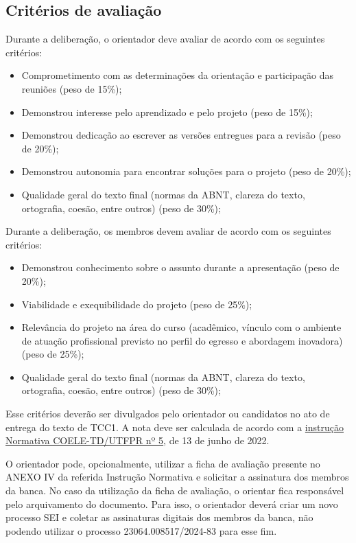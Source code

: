 \documentclass[a4paper, 12pt]{article}
\newcommand{\seiprocess}{23064.008517/2024-83} %
\begin{document}
	\subsection{Critérios de avaliação}

	Durante a deliberação, o orientador deve avaliar de acordo com os seguintes critérios:

	\begin{itemize}
		\item Comprometimento com as determinações da orientação e participação das reuniões (peso de 15\%);
		\item Demonstrou interesse pelo aprendizado e pelo projeto (peso de 15\%);
		\item Demonstrou dedicação ao escrever as versões entregues para a revisão (peso de 20\%);
		\item Demonstrou autonomia para encontrar soluções para o projeto (peso de 20\%);
		\item Qualidade geral do texto final (normas da ABNT, clareza do texto, ortografia, coesão, entre outros) (peso de 30\%);
	\end{itemize}

	Durante a deliberação, os membros devem avaliar de acordo com os seguintes critérios:

	\begin{itemize}
		\item Demonstrou conhecimento sobre o assunto durante a apresentação (peso de 20\%);
		\item Viabilidade e exequibilidade do projeto (peso de 25\%);
		\item Relevância do projeto na área do curso (acadêmico, vínculo com o ambiente de atuação profissional previsto no perfil do egresso e abordagem inovadora) (peso de 25\%);
		\item Qualidade geral do texto final (normas da ABNT, clareza do texto, ortografia, coesão, entre outros) (peso de 30\%);
	\end{itemize}

 	Esse critérios deverão ser divulgados pelo orientador ou candidatos no ato de entrega do texto de TCC1. A nota deve ser calculada de acordo com a \href{https://sei.utfpr.edu.br/sei/publicacoes/controlador_publicacoes.php?acao=publicacao_visualizar&id_documento=3053252&id_orgao_publicacao=0}{instrução Normativa COELE-TD/UTFPR nº 5}, de  13 de junho de 2022. 
	
	O orientador pode, opcionalmente, utilizar a ficha de avaliação presente no ANEXO IV da referida Instrução Normativa e solicitar a assinatura dos membros da banca. No caso da utilização da ficha de avaliação, o orientar fica responsável pelo arquivamento do documento. Para isso, o orientador deverá criar um novo processo SEI e coletar as assinaturas digitais dos membros da banca, não podendo utilizar o processo \seiprocess{} para esse fim.
\end{document}
